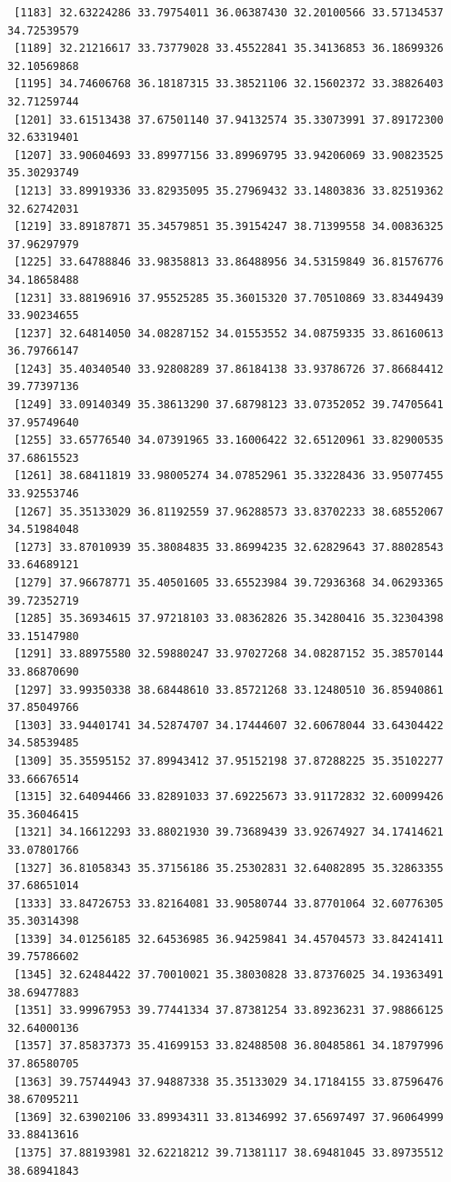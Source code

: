 \documentclass[
  letterpaper,
  DIV=11,
  numbers=noendperiod]{scrartcl}
\begin{document}
\begin{verbatim}
 [1183] 32.63224286 33.79754011 36.06387430 32.20100566 33.57134537 34.72539579
 [1189] 32.21216617 33.73779028 33.45522841 35.34136853 36.18699326 32.10569868
 [1195] 34.74606768 36.18187315 33.38521106 32.15602372 33.38826403 32.71259744
 [1201] 33.61513438 37.67501140 37.94132574 35.33073991 37.89172300 32.63319401
 [1207] 33.90604693 33.89977156 33.89969795 33.94206069 33.90823525 35.30293749
 [1213] 33.89919336 33.82935095 35.27969432 33.14803836 33.82519362 32.62742031
 [1219] 33.89187871 35.34579851 35.39154247 38.71399558 34.00836325 37.96297979
 [1225] 33.64788846 33.98358813 33.86488956 34.53159849 36.81576776 34.18658488
 [1231] 33.88196916 37.95525285 35.36015320 37.70510869 33.83449439 33.90234655
 [1237] 32.64814050 34.08287152 34.01553552 34.08759335 33.86160613 36.79766147
 [1243] 35.40340540 33.92808289 37.86184138 33.93786726 37.86684412 39.77397136
 [1249] 33.09140349 35.38613290 37.68798123 33.07352052 39.74705641 37.95749640
 [1255] 33.65776540 34.07391965 33.16006422 32.65120961 33.82900535 37.68615523
 [1261] 38.68411819 33.98005274 34.07852961 35.33228436 33.95077455 33.92553746
 [1267] 35.35133029 36.81192559 37.96288573 33.83702233 38.68552067 34.51984048
 [1273] 33.87010939 35.38084835 33.86994235 32.62829643 37.88028543 33.64689121
 [1279] 37.96678771 35.40501605 33.65523984 39.72936368 34.06293365 39.72352719
 [1285] 35.36934615 37.97218103 33.08362826 35.34280416 35.32304398 33.15147980
 [1291] 33.88975580 32.59880247 33.97027268 34.08287152 35.38570144 33.86870690
 [1297] 33.99350338 38.68448610 33.85721268 33.12480510 36.85940861 37.85049766
 [1303] 33.94401741 34.52874707 34.17444607 32.60678044 33.64304422 34.58539485
 [1309] 35.35595152 37.89943412 37.95152198 37.87288225 35.35102277 33.66676514
 [1315] 32.64094466 33.82891033 37.69225673 33.91172832 32.60099426 35.36046415
 [1321] 34.16612293 33.88021930 39.73689439 33.92674927 34.17414621 33.07801766
 [1327] 36.81058343 35.37156186 35.25302831 32.64082895 35.32863355 37.68651014
 [1333] 33.84726753 33.82164081 33.90580744 33.87701064 32.60776305 35.30314398
 [1339] 34.01256185 32.64536985 36.94259841 34.45704573 33.84241411 39.75786602
 [1345] 32.62484422 37.70010021 35.38030828 33.87376025 34.19363491 38.69477883
 [1351] 33.99967953 39.77441334 37.87381254 33.89236231 37.98866125 32.64000136
 [1357] 37.85837373 35.41699153 33.82488508 36.80485861 34.18797996 37.86580705
 [1363] 39.75744943 37.94887338 35.35133029 34.17184155 33.87596476 38.67095211
 [1369] 32.63902106 33.89934311 33.81346992 37.65697497 37.96064999 33.88413616
 [1375] 37.88193981 32.62218212 39.71381117 38.69481045 33.89735512 38.68941843

\end{verbatim}
\end{document}
